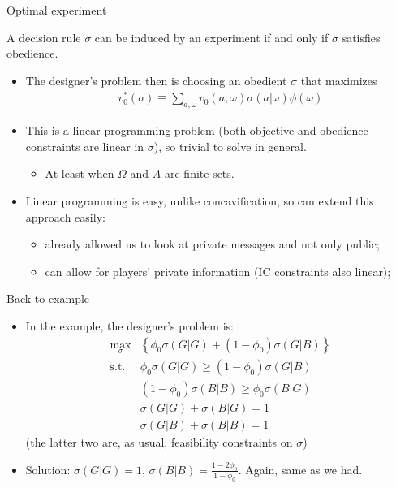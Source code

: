 \documentclass[english,10pt
,aspectratio=169
]{beamer}
\begin{document}
\begin{frame}{Optimal experiment}
\begin{theorem}
	A decision rule $\sigma$ can be induced by an experiment if and only if $\sigma$ satisfies obedience.
\end{theorem}
\begin{itemize}
	\item The designer's problem then is choosing an obedient $\sigma$ that maximizes
	\begin{align*}
		v_0^* (\sigma) \equiv  \sum_{a,\omega} v_0(a,\omega) \sigma (a | \omega) \phi(\omega)
	\end{align*}
	\item This is a linear programming problem (both objective and obedience constraints are linear in $\sigma$), so trivial to solve in general.
	\begin{itemize}
		\item At least when $\Omega$ and $A$ are finite sets.
	\end{itemize}
	\item Linear programming is easy, unlike concavification, so can extend this approach easily:
	\begin{itemize}
		\item already allowed us to look at private messages and not only public;
		\item can allow for players' private information (IC constraints also linear);
	\end{itemize}
\end{itemize}
\end{frame}


\begin{frame}{Back to example}
\begin{itemize}
	\item In the example, the designer's problem is:
	\begin{align*}
		\max_{\sigma} & \left\{ \phi_0 \sigma(G|G) + (1-\phi_0) \sigma(G|B) \right\}
		\\
		\text{s.t. } & \phi_0 \sigma(G|G) \geq (1-\phi_0) \sigma(G|B)
		\\
		&	(1-\phi_0) \sigma(B|B) \geq \phi_0 \sigma(B|G)
		\\
		&	\sigma(G|G) + \sigma(B|G) = 1
		\\
		&	\sigma(G|B) + \sigma(B|B) = 1
	\end{align*}
	(the latter two are, as usual, feasibility constraints on $\sigma$)
	
	\item Solution: $\sigma(G|G) = 1$, $\sigma(B|B) = \frac{1-2\phi_0}{1-\phi_0}$. Again, same as we had.
\end{itemize}
\end{frame}
\end{document}
